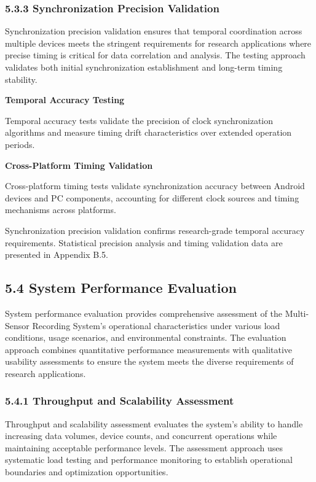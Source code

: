 \documentclass[12pt,a4paper]{article}
\begin{document}
\subsubsection{5.3.3 Synchronization Precision Validation}

Synchronization precision validation ensures that temporal coordination across multiple devices meets the stringent
requirements for research applications where precise timing is critical for data correlation and analysis. The testing
approach validates both initial synchronization establishment and long-term timing stability.

\textbf{Temporal Accuracy Testing}

Temporal accuracy tests validate the precision of clock synchronization algorithms and measure timing drift
characteristics over extended operation periods.

\textbf{Cross-Platform Timing Validation}

Cross-platform timing tests validate synchronization accuracy between Android devices and PC components, accounting for
different clock sources and timing mechanisms across platforms.

Synchronization precision validation confirms research-grade temporal accuracy requirements. Statistical precision
analysis and timing validation data are presented in Appendix B.5.

\subsection{5.4 System Performance Evaluation}

System performance evaluation provides comprehensive assessment of the Multi-Sensor Recording System's operational
characteristics under various load conditions, usage scenarios, and environmental constraints. The evaluation approach
combines quantitative performance measurements with qualitative usability assessments to ensure the system meets the
diverse requirements of research applications.

\subsubsection{5.4.1 Throughput and Scalability Assessment}

Throughput and scalability assessment evaluates the system's ability to handle increasing data volumes, device counts,
and concurrent operations while maintaining acceptable performance levels. The assessment approach uses systematic load
testing and performance monitoring to establish operational boundaries and optimization opportunities.
\end{document}
